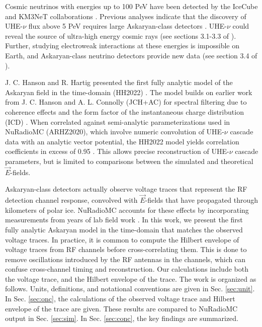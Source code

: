 \documentclass[amsmath,amssymb,aps,prd,10pt,twocolumn,showkeys]{revtex4}
\begin{document}
Cosmic neutrinos with energies up to 100 PeV have been detected by the IceCube and KM3NeT collaborations \cite{10.1126/science.1242856,aartsen2013first-bff,collaboration2016observation-03b,collaboration2018neutrino-2a0,collaboration2021detection-6fa,collaboration2022evidence-a08,collaboration2023observation-08b,collaboration2025observation-22f}. Previous analyses indicate that the discovery of UHE-$\nu$ flux above 5 PeV requires large Askaryan-class detectors \cite{10.1103/physrevd.98.062003}.  UHE-$\nu$ could reveal the source of ultra-high energy cosmic rays (see sections 3.1-3.3 of \cite{10.48550/arxiv.2008.04323}).  Further, studying electroweak interactions at these energies is impossible on Earth, and Askaryan-class neutrino detectors provide new data (see section 3.4 of \cite{10.48550/arxiv.2008.04323}).

J. C. Hanson and R. Hartig presented the first fully analytic model of the Askaryan field in the time-domain (HH2022) \cite{PhysRevD.105.123019}.  The model builds on earlier work from J. C. Hanson and A. L. Connolly (JCH+AC) for spectral filtering due to coherence effects and the form factor of the instantaneous charge distribution (ICD) \cite{10.1016/j.astropartphys.2017.03.008}.  When correlated against semi-analytic parameterizations used in NuRadioMC (ARHZ2020), which involve numeric convolution of UHE-$\nu$ cascade data with an analytic vector potential, the HH2022 model yields correlation coefficients in excess of 0.95 \cite{PhysRevD.101.083005,PhysRevD.105.123019}.  This allows precise reconstruction of UHE-$\nu$ cascade parameters, but is limited to comparisons between the simulated and theoretical $\vec{E}$-fields.

Askaryan-class detectors actually observe voltage traces that represent the RF detection channel response, convolved with $\vec{E}$-fields that have propagated through kilometers of polar ice.  NuRadioMC accounts for these effects by incorporating measurements from years of lab field work \cite{10.1016/j.astropartphys.2014.09.002,10.3189/2015jog14j214,10.3189/2015jog15j057,saltzberg,10.1103/PhysRevD.74.043002,ask_ice,10.1140/epjc/s10052-020-7612-8,Barwick:2018497,ALLISON201963,10.1088/1748-0221/15/09/p09039,deaconu2018measurements-182,welling2024brief-b47}.  In this work, we present the first fully analytic Askaryan model in the time-domain that matches the observed voltage traces.  In practice, it is common to compute the Hilbert envelope of voltage traces from RF channels before cross-correlating them.  This is done to remove oscillations introduced by the RF antennas in the channels, which can confuse cross-channel timing and reconstruction.  Our calculations include both the voltage trace, and the Hilbert envelope of the trace.  The work is organized as follows.  Units, definitions, and notational conventions are given in Sec. \ref{sec:unit}. In Sec. \ref{sec:onc}, the calculations of the observed voltage trace and Hilbert envelope of the trace are given.  These results are compared to NuRadioMC output in Sec. \ref{sec:sim}.  In Sec. \ref{sec:conc}, the key findings are summarized.
\end{document}
